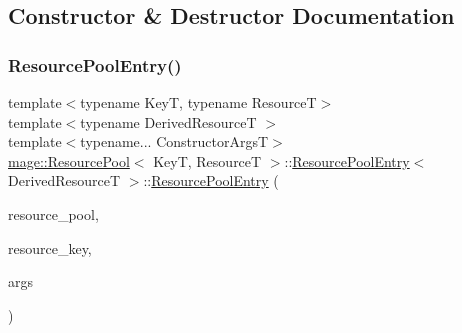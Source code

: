 \subsection{Constructor \& Destructor Documentation}
\hypertarget{structmage_1_1_resource_pool_1_1_resource_pool_entry_a8e255033a6f139f5f30e17869325eb2e}{}\label{structmage_1_1_resource_pool_1_1_resource_pool_entry_a8e255033a6f139f5f30e17869325eb2e} 
\subsubsection{\texorpdfstring{Resource\+Pool\+Entry()}{ResourcePoolEntry()}\hspace{0.1cm}{\footnotesize\ttfamily [1/3]}}
{\footnotesize\ttfamily template$<$typename KeyT, typename ResourceT$>$ \\
template$<$typename Derived\+ResourceT $>$ \\
template$<$typename... Constructor\+ArgsT$>$ \\
\hyperlink{classmage_1_1_resource_pool}{mage\+::\+Resource\+Pool}$<$ KeyT, ResourceT $>$\+::\hyperlink{structmage_1_1_resource_pool_1_1_resource_pool_entry}{Resource\+Pool\+Entry}$<$ Derived\+ResourceT $>$\+::\hyperlink{structmage_1_1_resource_pool_1_1_resource_pool_entry}{Resource\+Pool\+Entry} (\begin{DoxyParamCaption}\item[{\hyperlink{classmage_1_1_resource_pool}{Resource\+Pool}$<$ KeyT, ResourceT $>$ \&}]{resource\+\_\+pool,  }\item[{KeyT}]{resource\+\_\+key,  }\item[{Constructor\+ArgsT \&\&...}]{args }\end{DoxyParamCaption})}

\hypertarget{structmage_1_1_resource_pool_1_1_resource_pool_entry_a10ba1bc114b97a82fc957b17c3bef56e}{}\label{structmage_1_1_resource_pool_1_1_resource_pool_entry_a10ba1bc114b97a82fc957b17c3bef56e} 
